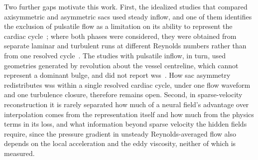 \documentclass[12pt,a4paper]{article}
\newcommand{\WSS}{\ac{wss}\xspace}
\theoremstyle{definition}
\numberwithin{equation}{section}
\begin{document}
Two further gaps motivate this work. First, the idealized studies that compared axisymmetric and asymmetric sacs used steady inflow, and one of them identifies the exclusion of pulsatile flow as a limitation on its ability to represent the cardiac cycle~\cite{rehman2024comparative}; where both phases were considered, they were obtained from separate laminar and turbulent runs at different Reynolds numbers rather than from one resolved cycle~\cite{rehman2025application,moroni2025insight}. The studies with pulsatile inflow, in turn, used geometries generated by revolution about the vessel centreline, which cannot represent a dominant bulge, and did not report \WSS~\cite{jin2021arterial,guerrero2023efficient}. How sac asymmetry redistributes \WSS within a single resolved cardiac cycle, under one flow waveform and one turbulence closure, therefore remains open. Second, in sparse-velocity reconstruction it is rarely separated how much of a neural field's advantage over interpolation comes from the representation itself and how much from the physics terms in its loss, and what information beyond sparse velocity the hidden fields require, since the pressure gradient in unsteady Reynolds-averaged flow also depends on the local acceleration and the eddy viscosity, neither of which is measured.
\end{document}
